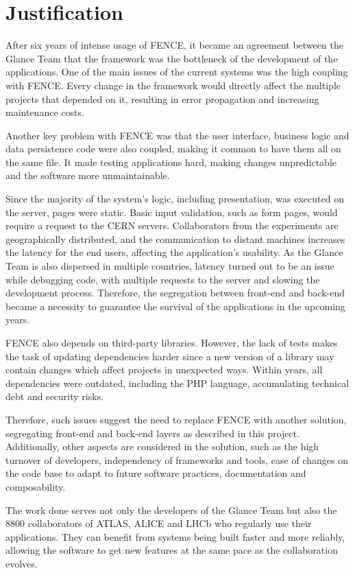\section{Justification}

After six years of intense usage of FENCE, it became an agreement between the Glance Team that the framework was the bottleneck of the development of the applications. One of the main issues of the current systems was the high coupling with FENCE. Every change in the framework would directly affect the multiple projects that depended on it, resulting in error propagation and increasing maintenance costs.

Another key problem with FENCE was that the user interface, business logic and data persistence code were also coupled, making it common to have them all on the same file. It made testing applications hard, making changes unpredictable and the software more unmaintainable.

Since the majority of the system's logic, including presentation, was executed on the server, pages were static. Basic input validation, such as form pages, would require a request to the CERN servers. Collaborators from the experiments are geographically distributed, and the communication to distant machines increases the latency for the end users, affecting the application's usability. As the Glance Team is also dispersed in multiple countries, latency turned out to be an issue while debugging code, with multiple requests to the server and slowing the development process. Therefore, the segregation between front-end and back-end became a necessity to guarantee the survival of the applications in the upcoming years.

FENCE also depends on third-party libraries. However, the lack of tests makes the task of updating dependencies harder since a new version of a library may contain changes which affect projects in unexpected ways. Within years, all dependencies were outdated, including the PHP language, accumulating technical debt and security risks.

Therefore, such issues suggest the need to replace FENCE with another solution, segregating front-end and back-end layers as described in this project. Additionally, other aspects are considered in the solution, such as the high turnover of developers, independency of frameworks and tools, ease of changes on the code base to adapt to future software practices, documentation and composability.

The work done serves not only the developers of the Glance Team but also the 8800 collaborators of ATLAS, ALICE and LHCb who regularly use their applications. They can benefit from systems being built faster and more reliably, allowing the software to get new features at the same pace as the collaboration evolves.

